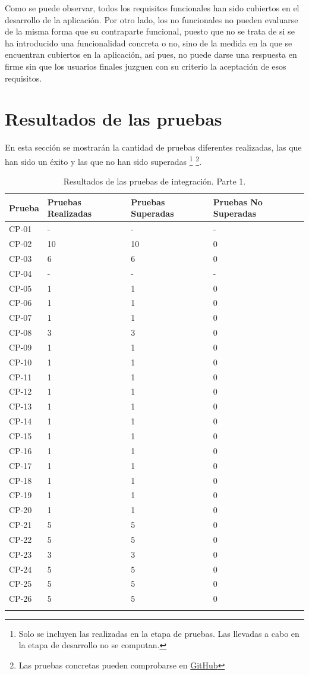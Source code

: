 Como se puede observar, todos los requisitos funcionales han sido cubiertos en el desarrollo de la aplicación. Por otro lado, los no funcionales no 
pueden evaluarse de la misma forma que su contraparte funcional, puesto que no se trata de si se ha introducido una funcionalidad concreta o no, sino 
de la medida en la que se encuentran cubiertos en la aplicación, así pues, no puede darse una respuesta en firme sin que los usuarios finales juzguen con su criterio
la aceptación de esos requisitos.

\newpage
\section{Resultados de las pruebas}
En esta sección se mostrarán la cantidad de pruebas diferentes realizadas, las que han sido un éxito y las que no han sido superadas 
\footnote{Solo se incluyen las realizadas en la etapa de pruebas. Las llevadas a cabo en la etapa de desarrollo no se computan. }
\footnote{Las pruebas concretas pueden comprobarse en \href{https://github.com/GabiHV/TFM/issues?q=is\%3Aissue\%20state\%3Aclosed\%20label\%3Atesting}{GitHub}}.
\begin{longtable}{|p{2cm}|p{4cm}|p{4cm}|p{4cm}|}
\hline
\textbf{Prueba} & \textbf{Pruebas Realizadas} & \textbf{Pruebas Superadas} & \textbf{Pruebas No Superadas} \\
\hline
CP-01 & - & - & - \\
\hline
CP-02 & 10 & 10 & 0 \\
\hline
CP-03 & 6 & 6 & 0 \\
\hline
CP-04 & - & - & - \\
\hline
CP-05 & 1 & 1 & 0 \\
\hline
CP-06 & 1 & 1 & 0 \\
\hline
CP-07 & 1 & 1 & 0 \\
\hline
CP-08 & 3 & 3 & 0 \\
\hline
CP-09 & 1 & 1 & 0 \\
\hline
CP-10 & 1 & 1 & 0 \\
\hline
CP-11 & 1 & 1 & 0 \\
\hline
CP-12 & 1 & 1 & 0 \\
\hline
CP-13 & 1 & 1 & 0 \\
\hline
CP-14 & 1 & 1 & 0 \\
\hline
CP-15 & 1 & 1 & 0 \\
\hline
CP-16 & 1 & 1 & 0 \\
\hline
CP-17 & 1 & 1 & 0 \\
\hline
CP-18 & 1 & 1 & 0 \\
\hline
CP-19 & 1 & 1 & 0 \\
\hline
CP-20 & 1 & 1 & 0 \\
\hline
CP-21 & 5 & 5 & 0 \\
\hline
CP-22 & 5 & 5 & 0 \\
\hline
CP-23 & 3 & 3 & 0 \\
\hline
CP-24 & 5 & 5 & 0 \\
\hline
CP-25 & 5 & 5 & 0 \\
\hline
CP-26 & 5 & 5 & 0 \\
\hline

\caption{Resultados de las pruebas de integración. Parte 1.}
\end{longtable}


